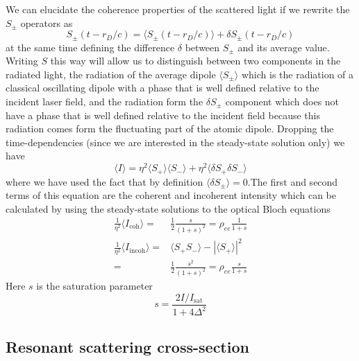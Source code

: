 \documentclass[11pt,letter]{article}
\begin{document}
We can elucidate the coherence properties of the scattered light if we rewrite the $S_{\pm}$ operators as 
\begin{equation} 
    S_{\pm}( t - r_{D}/c) = \langle S_{\pm}(t-r_{D}/c) \rangle + \delta S_{\pm}(t-r_{D}/c) 
\end{equation} 
at the same time defining the difference $\delta$ between $S_{\pm}$ and its
average value.   Writing $S$ this way will allow us to distinguish between two
components in the radiated light,  the radiation of the average dipole $\langle
S_{\pm}\rangle$ which is the radiation of a classical oscillating dipole with
a phase that is well defined relative to the incident laser field, and the
radiation form the $\delta S_{\pm}$ component which does not have a phase that
is well defined relative to the incident field because this radiation comes
form the fluctuating part of the atomic dipole.  Dropping the time-dependencies
(since we are interested in the steady-state solution only) we have
\begin{equation} 
\langle I \rangle = \eta^{2} \langle S_{+}\rangle \langle S_{-} \rangle + \eta^{2} \langle \delta S_{+} \delta S_{-} \rangle 
\end{equation}
where we have used the fact that by definition $\langle \delta S_{\pm} \rangle = 0$.The first and second terms of this equation are the coherent and incoherent intensity which can be calculated by using the steady-state solutions to the optical Bloch equations
\begin{equation}
\begin{split} 
    \frac{1}{\eta^{2}} \langle I_{\mathrm{coh}} \rangle = &
        \frac{1}{2} \frac{s}{(1+s)^{2} } 
      = \rho_{ee}  \frac{1}{1+s} \\
    \frac{1}{\eta^{2}} \langle I_{\mathrm{incoh}} \rangle = & 
        \langle S_{+}S_{-} \rangle - |\langle S_{+} \rangle |^{2} \\
      =&\frac{1}{2} \frac{s^{2}}{(1+s)^{2}} = \rho_{ee} \frac{s}{1+s}
\end{split}
\end{equation}
Here $s$ is the saturation parameter
\begin{equation}
s = \frac{ 2  I/I_{\mathrm{sat}} } { 1 + 4 \Delta^{2} } 
\end{equation}


\subsection{Resonant scattering cross-section}
\end{document}
